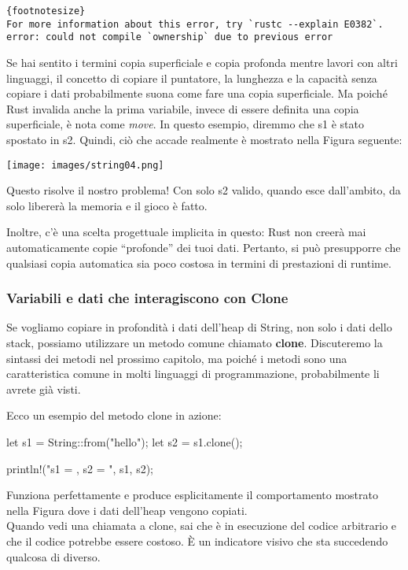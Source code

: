 \documentclass[11pt,a4paper]{article}
\begin{document}
{\begin{verbatim}{footnotesize}
For more information about this error, try `rustc --explain E0382`.
error: could not compile `ownership` due to previous error
\end{verbatim}

Se hai sentito i termini copia superficiale e copia profonda mentre lavori con altri linguaggi, il concetto di copiare il puntatore, la lunghezza e la capacità senza copiare i dati probabilmente suona come fare una copia superficiale. Ma poiché Rust invalida anche la prima variabile, invece di essere definita una copia superficiale, è nota come \textit{move}. In questo esempio, diremmo che s1 è stato spostato in s2. Quindi, ciò che accade realmente è mostrato nella Figura seguente:

\begin{center}
\texttt{[image: images/string04.png]}
\end{center}

Questo risolve il nostro problema! Con solo s2 valido, quando esce dall'ambito, da solo libererà la memoria e il gioco è fatto.

Inoltre, c’è una scelta progettuale implicita in questo: Rust non creerà mai automaticamente copie “profonde” dei tuoi dati. Pertanto, si può presupporre che qualsiasi copia automatica sia poco costosa in termini di prestazioni di runtime.

\subsubsection{Variabili e dati che interagiscono con Clone}
Se vogliamo copiare in profondità i dati dell'heap di String, non solo i dati dello stack, possiamo utilizzare un metodo comune chiamato \textbf{clone}. Discuteremo la sintassi dei metodi nel prossimo capitolo, ma poiché i metodi sono una caratteristica comune in molti linguaggi di programmazione, probabilmente li avrete già visti.

Ecco un esempio del metodo clone in azione:
\begin{rust}
    let s1 = String::from("hello");
    let s2 = s1.clone();

    println!("s1 = {}, s2 = {}", s1, s2);
\end{rust}

Funziona perfettamente e produce esplicitamente il comportamento mostrato nella Figura dove i dati dell'heap vengono copiati.\\
Quando vedi una chiamata a clone, sai che è in esecuzione del codice arbitrario e che il codice potrebbe essere costoso. È un indicatore visivo che sta succedendo qualcosa di diverso.

}
\end{document}
